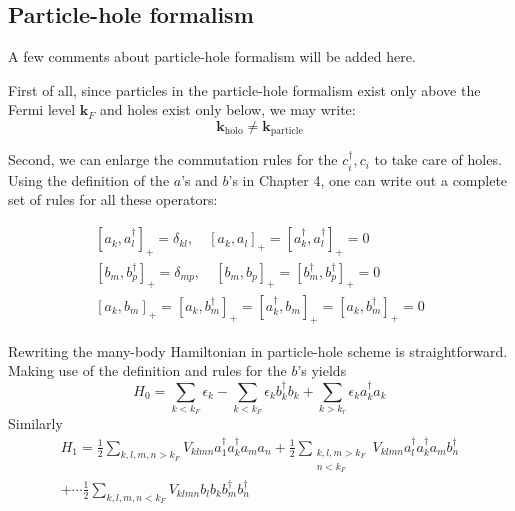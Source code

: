 \subsection{Particle-hole formalism}
A few comments about particle-hole formalism will be added here.

First of all, since particles in the particle-hole formalism exist only above the Fermi level $\mathbf{k}_F$ and holes exist only below, we may write:
\begin{equation}\mathbf{k}_{\mathrm{holo}} \neq \mathbf{k}_{\text {particle}}\end{equation}

Second, we can enlarge the commutation rules for the $c^{\dagger}_i,c_i$ to take care of holes. Using the definition of the $a$'s and $b$'s in Chapter 4, one can write out a complete set of rules for all these operators:
\begin{imp}
\begin{equation}\begin{array}{c}
{\left[a_{k}, a_{l}^{\dagger}\right]_{+}=\delta_{k l}, \quad\left[a_{k}, a_{l}\right]_{+}=\left[a_{k}^{\dagger}, a_{l}^{\dagger}\right]_{+}=0} \\
{\left[b_{m}, b_{p}^{\dagger}\right]_{+}=\delta_{m p}, \quad\left[b_{m}, b_{p}\right]_{+}=\left[b_{m}^{\dagger}, b_{p}^{\dagger}\right]_{+}=0} \\
{\left[a_{k}, b_{m}\right]_{+}=\left[a_{k}, b_{m}^{\dagger}\right]_{+}=\left[a_{k}^{\dagger}, b_{m}\right]_{+}=\left[a_{k}, b_{m}^{\dagger}\right]_{+}=0}
\end{array}\end{equation}
\end{imp}
Rewriting the many-body Hamiltonian in particle-hole scheme is straightforward. Making use of the definition and rules for the $b$'s yields
\begin{equation}H_{0}=\sum_{k<k_{F}} \epsilon_{k}-\sum_{k<k_{F}} \epsilon_{k} b_{k}^{\dagger} b_{k}+\sum_{k>k_{r}} \epsilon_{k} a_{k}^{\dagger} a_{k}
\label{H0-particle-hole}
\end{equation}
Similarly
\begin{equation}\begin{array}{c}
H_{1}=\frac{1}{2} \sum_{k, l, m, n>k_F} V_{klmn} a_{1}^{\dagger} a_{k}^{\dagger} a_{m} a_{n}+\frac{1}{2} \sum_{\substack{k, l, m>k_{F}\\n<k_F}} V_{k lm n} a_{l}^{\dagger} a_{k}^{\dagger} a_{m} b_{n}^{\dagger} \\
+\cdots \frac{1}{2} \sum_{k, l, m, n<k_{F}} V_{klmn} b_{l} b_{k} b_{m}^{\dagger} b_{n}^{\dagger}
\end{array}
\label{H1-particle-hole}
\end{equation}
